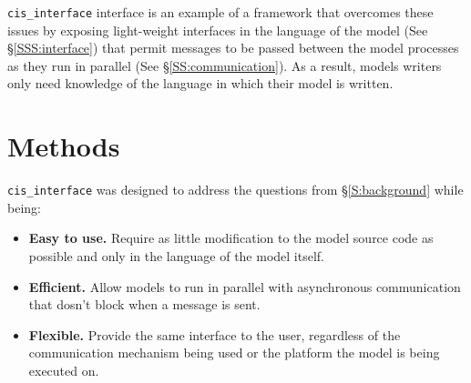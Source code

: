 \documentclass[journal]{IEEEtran}
\newcommand{\cis}{{\tt cis\_interface}{}}
\begin{document}
{\cis} interface is an example of a framework that overcomes these issues by exposing light-weight interfaces in the language of the model (See \S\ref{SSS:interface}) that permit messages to be passed between the model processes as they run in parallel (See \S\ref{SS:communication}). As a result, models writers only need knowledge of the language in which their model is written.

%

\section{Methods}\label{S:methods}

{\cis} was designed to address the questions from \S\ref{S:background} while being:

\begin{itemize}
	\item {\bf Easy to use.} Require as little modification to the model source code as possible and only in the language of the model itself.
	\item {\bf Efficient.} Allow models to run in parallel with asynchronous communication that dosn't block when a message is sent.
	\item {\bf Flexible.} Provide the same interface to the user, regardless of the communication mechanism being used or the platform the model is being executed on.
\end{itemize}
\end{document}
